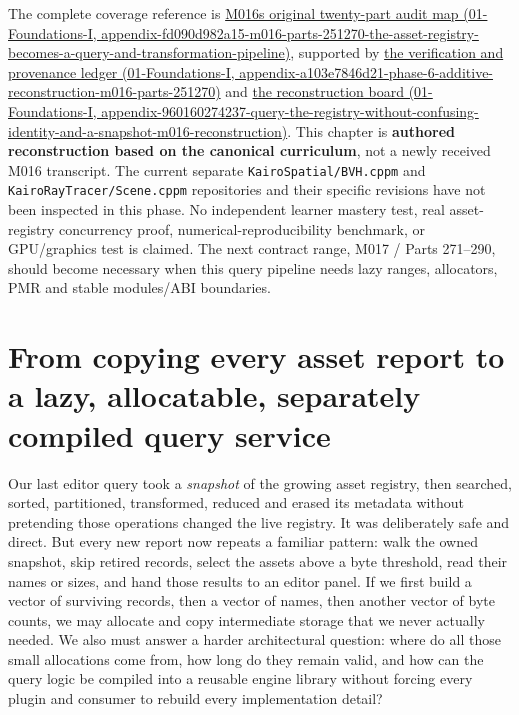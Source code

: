 The complete coverage reference is \href{../01-Foundations-I/main.pdf\#nameddest=appendix-fd090d982a15-m016-parts-251270-the-asset-registry-becomes-a-query-and-transformation-pipeline}{M016\textquotesingle s original twenty-part audit map (01-Foundations-I, appendix-fd090d982a15-m016-parts-251270-the-asset-registry-becomes-a-query-and-transformation-pipeline)}, supported by \href{../01-Foundations-I/main.pdf\#nameddest=appendix-a103e7846d21-phase-6-additive-reconstruction-m016-parts-251270}{the verification and provenance ledger (01-Foundations-I, appendix-a103e7846d21-phase-6-additive-reconstruction-m016-parts-251270)} and \href{../01-Foundations-I/main.pdf\#nameddest=appendix-960160274237-query-the-registry-without-confusing-identity-and-a-snapshot-m016-reconstruction}{the reconstruction board (01-Foundations-I, appendix-960160274237-query-the-registry-without-confusing-identity-and-a-snapshot-m016-reconstruction)}. This chapter is \textbf{authored reconstruction based on the canonical curriculum}, not a newly received M016 transcript. The current separate \texttt{KairoSpatial/BVH.cppm} and \texttt{KairoRayTracer/Scene.cppm} repositories and their specific revisions have not been inspected in this phase. No independent learner mastery test, real asset-registry concurrency proof, numerical-reproducibility benchmark, or GPU/graphics test is claimed. The next contract range, M017 / Parts 271--290, should become necessary when this query pipeline needs lazy ranges, allocators, PMR and stable modules/ABI boundaries.

\section{From copying every asset report to a lazy, allocatable, separately compiled query service}\label{05-engine-i-ch006-from-copying-every-asset-report-to-a-lazy-allocatable-separately-compiled-query-service}

Our last editor query took a \emph{snapshot} of the growing asset registry, then searched, sorted, partitioned, transformed, reduced and erased its metadata without pretending those operations changed the live registry. It was deliberately safe and direct. But every new report now repeats a familiar pattern: walk the owned snapshot, skip retired records, select the assets above a byte threshold, read their names or sizes, and hand those results to an editor panel. If we first build a vector of surviving records, then a vector of names, then another vector of byte counts, we may allocate and copy intermediate storage that we never actually needed. We also must answer a harder architectural question: where do all those small allocations come from, how long do they remain valid, and how can the query logic be compiled into a reusable engine library without forcing every plugin and consumer to rebuild every implementation detail?

